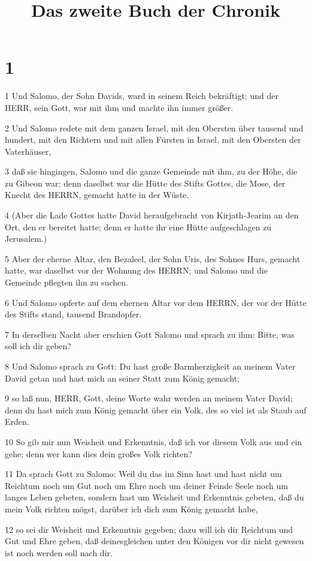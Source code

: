 

\title{Das zweite Buch der Chronik}


\chapter{1}

\par 1 Und Salomo, der Sohn Davids, ward in seinem Reich bekräftigt; und der HERR, sein Gott, war mit ihm und machte ihn immer größer.
\par 2 Und Salomo redete mit dem ganzen Israel, mit den Obersten über tausend und hundert, mit den Richtern und mit allen Fürsten in Israel, mit den Obersten der Vaterhäuser,
\par 3 daß sie hingingen, Salomo und die ganze Gemeinde mit ihm, zu der Höhe, die zu Gibeon war; denn daselbst war die Hütte des Stifts Gottes, die Mose, der Knecht des HERRN, gemacht hatte in der Wüste.
\par 4 (Aber die Lade Gottes hatte David heraufgebracht von Kirjath-Jearim an den Ort, den er bereitet hatte; denn er hatte ihr eine Hütte aufgeschlagen zu Jerusalem.)
\par 5 Aber der eherne Altar, den Bezaleel, der Sohn Uris, des Sohnes Hurs, gemacht hatte, war daselbst vor der Wohnung des HERRN; und Salomo und die Gemeinde pflegten ihn zu suchen.
\par 6 Und Salomo opferte auf dem ehernen Altar vor dem HERRN, der vor der Hütte des Stifts stand, tausend Brandopfer.
\par 7 In derselben Nacht aber erschien Gott Salomo und sprach zu ihm: Bitte, was soll ich dir geben?
\par 8 Und Salomo sprach zu Gott: Du hast große Barmherzigkeit an meinem Vater David getan und hast mich an seiner Statt zum König gemacht;
\par 9 so laß nun, HERR, Gott, deine Worte wahr werden an meinem Vater David; denn du hast mich zum König gemacht über ein Volk, des so viel ist als Staub auf Erden.
\par 10 So gib mir nun Weisheit und Erkenntnis, daß ich vor diesem Volk aus und ein gehe; denn wer kann dies dein großes Volk richten?
\par 11 Da sprach Gott zu Salomo: Weil du das im Sinn hast und hast nicht um Reichtum noch um Gut noch um Ehre noch um deiner Feinde Seele noch um langes Leben gebeten, sondern hast um Weisheit und Erkenntnis gebeten, daß du mein Volk richten mögst, darüber ich dich zum König gemacht habe,
\par 12 so sei dir Weisheit und Erkenntnis gegeben; dazu will ich dir Reichtum und Gut und Ehre geben, daß deinesgleichen unter den Königen vor dir nicht gewesen ist noch werden soll nach dir.
